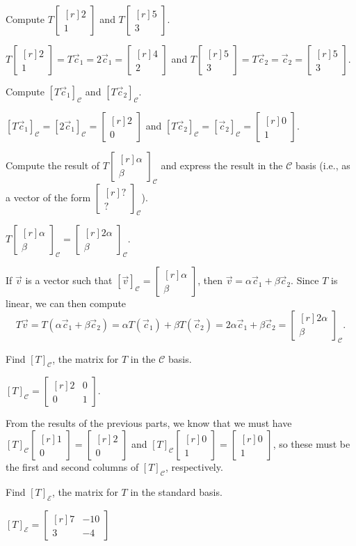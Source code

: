 \documentclass{problemset}
\newcommand{\mat}[1]{\begin{bmatrix*}[r]#1\end{bmatrix*}}
\begin{document}
	\begin{parts}[resume]
		\item Compute $T\mat{2\\1}$ and $T\mat{5\\3}$.
			\begin{solution}[inline]
				$T\mat{2\\1}=T\vec c_1=2\vec c_1=\mat{4\\2}$ and 
				$T\mat{5\\3}=T\vec c_2=\vec c_2=\mat{5\\3}$.
			\end{solution}
		\item Compute $[T\vec c_1]_{\mathcal C}$ and $[T\vec c_2]_{\mathcal C}$.
			\begin{solution}[inline]
				$[T\vec c_1]_{\mathcal C}=[2\vec c_1]_{\mathcal C}=\mat{2\\0}$ and
				$[T\vec c_2]_{\mathcal C}=[\vec c_2]_{\mathcal C}=\mat{0\\1}$.
			\end{solution}
		\item Compute the result of $T\mat{\alpha\\\beta}_{\mathcal C}$ and express the result in the
			$\mathcal C$ basis (i.e., as a vector of the form $\mat{?\\?}_{\mathcal C}$).
			\begin{solution}
				$T\mat{\alpha\\\beta}_{\mathcal C}=\mat{2\alpha\\\beta}_{\mathcal C}$.

				If $\vec v$ is a vector such that 
				$[\vec v]_{\mathcal C}=\mat{\alpha\\\beta}$, then 
				$\vec v=\alpha\vec c_1+\beta\vec c_2$. Since $T$ is linear, we can
				then compute
				\[
					T\vec v
					=T(\alpha\vec c_1+\beta\vec c_2)
					=\alpha T(\vec c_1)+\beta T(\vec c_2)
					=2\alpha\vec c_1+\beta\vec c_2
					=\mat{2\alpha\\\beta}_{\mathcal C}.
				\]
			\end{solution}
		\item Find $[T]_{\mathcal C}$, the matrix for $T$ in the $\mathcal C$ basis.
			\begin{solution}
				$[T]_{\mathcal C}=\mat{2&0\\0&1}$. 

				From the results of the previous parts, we know that we must have
				$[T]_{\mathcal C}\mat{1\\0}=\mat{2\\0}$ and 
				$[T]_{\mathcal C}\mat{0\\1}=\mat{0\\1}$, so these 
				must be the first and second columns of $[T]_{\mathcal C}$, respectively.
			\end{solution}
		\item Find $[T]_{\mathcal E}$, the matrix for $T$ in the standard basis.
			\begin{solution}
				$[T]_{\mathcal E}=\mat{7&-10\\3&-4}$
				

\end{solution}
\end{parts}
\end{document}
